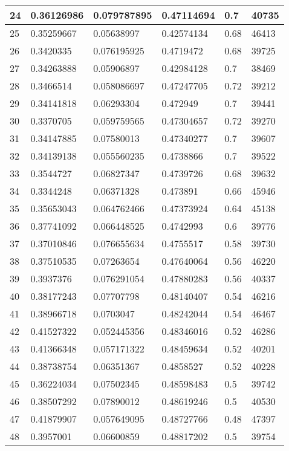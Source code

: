 \begin{longtable}{|l|l|l|l|l|l|}
24 & 0.36126986 & 0.079787895 & 0.47114694 & 0.7 & 40735 \\ \hline 
25 & 0.35259667 & 0.05638997 & 0.42574134 & 0.68 & 46413 \\ \hline 
26 & 0.3420335 & 0.076195925 & 0.4719472 & 0.68 & 39725 \\ \hline 
27 & 0.34263888 & 0.05906897 & 0.42984128 & 0.7 & 38469 \\ \hline 
28 & 0.3466514 & 0.058086697 & 0.47247705 & 0.72 & 39212 \\ \hline 
29 & 0.34141818 & 0.06293304 & 0.472949 & 0.7 & 39441 \\ \hline 
30 & 0.3370705 & 0.059759565 & 0.47304657 & 0.72 & 39270 \\ \hline 
31 & 0.34147885 & 0.07580013 & 0.47340277 & 0.7 & 39607 \\ \hline 
32 & 0.34139138 & 0.055560235 & 0.4738866 & 0.7 & 39522 \\ \hline 
33 & 0.3544727 & 0.06827347 & 0.4739726 & 0.68 & 39632 \\ \hline 
34 & 0.3344248 & 0.06371328 & 0.473891 & 0.66 & 45946 \\ \hline 
35 & 0.35653043 & 0.064762466 & 0.47373924 & 0.64 & 45138 \\ \hline 
36 & 0.37741092 & 0.066448525 & 0.4742993 & 0.6 & 39776 \\ \hline 
37 & 0.37010846 & 0.076655634 & 0.4755517 & 0.58 & 39730 \\ \hline 
38 & 0.37510535 & 0.07263654 & 0.47640064 & 0.56 & 46220 \\ \hline 
39 & 0.3937376 & 0.076291054 & 0.47880283 & 0.56 & 40337 \\ \hline 
40 & 0.38177243 & 0.07707798 & 0.48140407 & 0.54 & 46216 \\ \hline 
41 & 0.38966718 & 0.0703047 & 0.48242044 & 0.54 & 46467 \\ \hline 
42 & 0.41527322 & 0.052445356 & 0.48346016 & 0.52 & 46286 \\ \hline 
43 & 0.41366348 & 0.057171322 & 0.48459634 & 0.52 & 40201 \\ \hline 
44 & 0.38738754 & 0.06351367 & 0.4858527 & 0.52 & 40228 \\ \hline 
45 & 0.36224034 & 0.07502345 & 0.48598483 & 0.5 & 39742 \\ \hline 
46 & 0.38507292 & 0.07890012 & 0.48619246 & 0.5 & 40530 \\ \hline 
47 & 0.41879907 & 0.057649095 & 0.48727766 & 0.48 & 47397 \\ \hline 
48 & 0.3957001 & 0.06600859 & 0.48817202 & 0.5 & 39754 \\ \hline 

\end{longtable}
